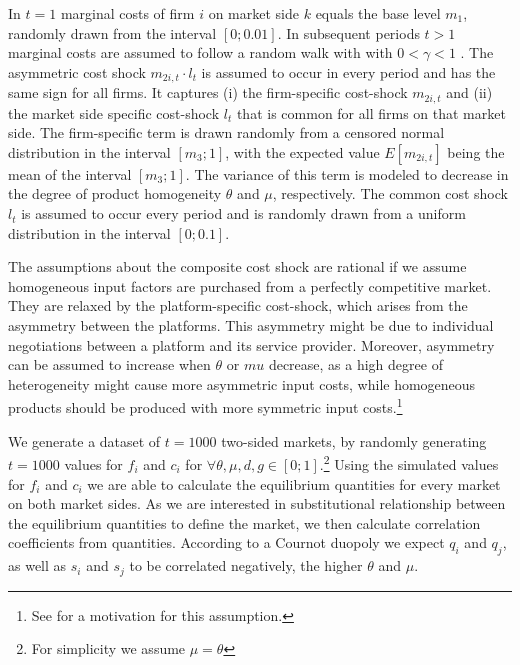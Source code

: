 \documentclass[12pt,a4paper,notitlepage]{article}
\begin{document}
In $t=1$ marginal costs of firm $i$ on market side $k$ equals the base level $m_1$, randomly drawn from the interval $[0;0.01]$. In subsequent periods $t>1$ marginal costs are assumed to follow a random walk with with $0<\gamma<1$ \citep[241]{harrington_detecting_2008}. The asymmetric cost shock $m_{2i,t} \cdot l_t$ is assumed to occur in every period and has the same sign for all firms. It captures (i) the firm-specific cost-shock $m_{2i,t}$ and (ii) the market side specific cost-shock $l_t$ that is common for all firms on that market side. The firm-specific term is drawn randomly from a censored normal distribution in the interval $[m_3;1]$, with the expected value $E[m_{2i,t}]$ being the mean of the interval $[m_3;1]$. The variance of this term is modeled to decrease in the degree of product homogeneity $\theta$ and $\mu$, respectively. The common cost shock $l_t$ is assumed to occur every period and is randomly drawn from a uniform distribution in the interval $[0;0.1]$.

The assumptions about the composite cost shock are rational if we assume homogeneous input factors are purchased from a perfectly competitive market. They are relaxed by the platform-specific cost-shock, which arises from the asymmetry between the platforms. This asymmetry might be due to individual negotiations between a platform and its service provider. Moreover, asymmetry can be assumed to increase when $\theta$ or $mu$ decrease, as a high degree of heterogeneity might cause more asymmetric input costs, while homogeneous products should be produced with more symmetric input costs.\footnote{See \citep[17]{paha_empirical_2011} for a motivation for this assumption.} 

We generate a dataset of $t=1000$ two-sided markets, by randomly generating $t=1000$ values for $f_i$ and $c_i$ for $\forall \theta,\mu,d,g \in [0;1]$.\footnote{For simplicity we assume $\mu=\theta$} Using the simulated values for $f_i$ and $c_i$ we are able to calculate the equilibrium quantities for every market on both market sides. As we are interested in substitutional relationship between the equilibrium quantities to define the market, we then calculate correlation coefficients from quantities. According to a Cournot duopoly we expect $q_i$ and $q_j$, as well as $s_i$ and $s_j$ to be correlated negatively, the higher $\theta$ and $\mu$. 
\end{document}
